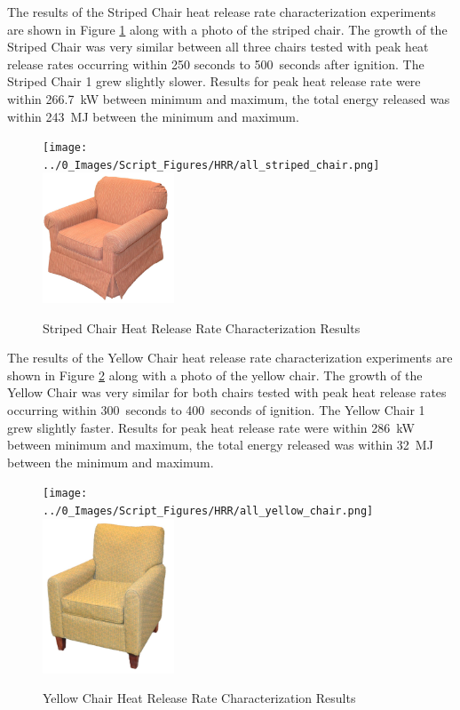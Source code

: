 \documentclass[12pt,oneside]{book}
\begin{document}
The results of the Striped Chair heat release rate characterization experiments are shown in Figure \ref{fig:striped_chair_HRR} along with a photo of the striped chair. The growth of the Striped Chair was very similar between all three chairs tested with peak heat release rates occurring within 250 seconds to 500~seconds after ignition. The Striped Chair 1 grew slightly slower. Results for peak heat release rate were within 266.7~kW between minimum and maximum, the total energy released was within 243~MJ between the minimum and maximum. 

\begin{figure}[H]
	\centering
	\texttt{[image: ../0\_Images/Script\_Figures/HRR/all\_striped\_chair.png]}
	\includegraphics[width=0.35\textwidth]{../0_Images/Fuel/Striped_Chair.jpg}
	\caption{Striped Chair Heat Release Rate Characterization Results}
	\label{fig:striped_chair_HRR}
\end{figure}

The results of the Yellow Chair heat release rate characterization experiments are shown in Figure \ref{fig:yellow_chair_HRR} along with a photo of the yellow chair. The growth of the Yellow Chair was very similar for both chairs tested with peak heat release rates occurring within 300~seconds to 400~seconds of ignition. The Yellow Chair 1 grew slightly faster. Results for peak heat release rate were within 286~kW between minimum and maximum, the total energy released was within 32~MJ between the minimum and maximum. 

\begin{figure}[H]
	\centering
	\texttt{[image: ../0\_Images/Script\_Figures/HRR/all\_yellow\_chair.png]}
	\includegraphics[width=0.35\textwidth]{../0_Images/Fuel/Yellow_Chair.jpg}
	\caption{Yellow Chair Heat Release Rate Characterization Results}
	\label{fig:yellow_chair_HRR}
\end{figure}
\end{document}
